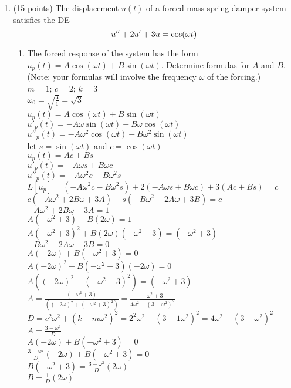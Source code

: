 \documentclass{article}
\begin{document}
\begin{enumerate}
\bigskip
\item (15 points) The displacement $u(t)$ of a forced mass-spring-damper system satisfies the DE
\[
u\sp{\prime\prime}+2u\sp\prime+3u=\cos(\omega t)
\]
\begin{enumerate}
\item The forced response of the system has the form $u_p(t)=A\cos(\omega t)+B\sin(\omega t)$.  Determine formulas for $A$ and $B$.  (Note: your formulas will involve the frequency $\omega$ of the forcing.)
\\$m=1$; $c=2$; $k=3$
\\$\omega_0=\sqrt{\frac{3}{1}}=\sqrt{3}$
\\$u_p(t)=A\cos(\omega t)+B\sin(\omega t)$
\\$u'_p(t)=-A\omega\sin(\omega t)+B\omega\cos(\omega t)$
\\$u''_p(t)=-A\omega^2\cos(\omega t)-B\omega^2\sin(\omega t)$
\\let $s=\sin(\omega t)$ and $c=\cos(\omega t)$
\\$u_p(t)=Ac+Bs$
\\$u'_p(t)=-A\omega s+B\omega c$
\\$u''_p(t)=-A\omega^2c-B\omega^2s$
\\$L[u_p]=(-A\omega^2c-B\omega^2s)+2(-A\omega s+B\omega c)+3(Ac+Bs)=c$
\\$c(-A\omega^2+2B\omega+3A)+s(-B\omega^2-2A\omega+3B)=c$
\\$-A\omega^2+2B\omega+3A=1$
\\$A(-\omega^2+3)+B(2\omega)=1$
\\$A(-\omega^2+3)^2+B(2\omega)(-\omega^2+3)=(-\omega^2+3)$
\\$-B\omega^2-2A\omega+3B=0$
\\$A(-2\omega)+B(-\omega^2+3)=0$
\\$A(-2\omega)^2+B(-\omega^2+3)(-2\omega)=0$
\\$A((-2\omega)^2+(-\omega^2+3)^2)=(-\omega^2+3)$
\\$A=\frac{(-\omega^2+3)}{((-2\omega)^2+(-\omega^2+3)^2)}=\frac{-\omega^2+3}{4\omega^2+(3-\omega^2)^2}$
\\$D=c^2\omega^2+(k-m\omega^2)^2=2^2\omega^2+(3-1\omega^2)^2=4\omega^2+(3-\omega^2)^2$
\\$A=\frac{3-\omega^2}{D}$
\\$A(-2\omega)+B(-\omega^2+3)=0$
\\$\frac{3-\omega^2}{D}(-2\omega)+B(-\omega^2+3)=0$
\\$B(-\omega^2+3)=\frac{3-\omega^2}{D}(2\omega)$
\\$B=\frac{1}{D}(2\omega)$

\end{enumerate}
\end{enumerate}
\end{document}
